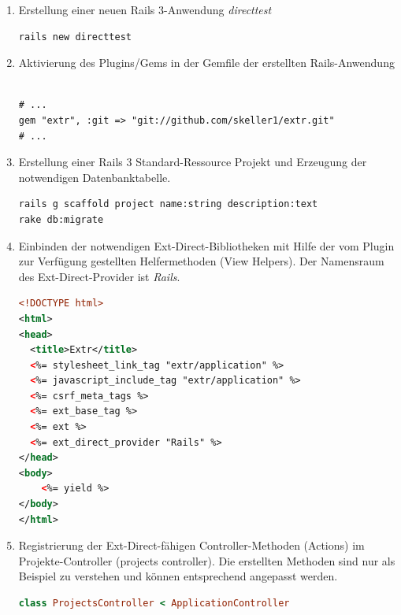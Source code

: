 \begin{enumerate}
\item
Erstellung einer neuen Rails 3-Anwendung \emph{directtest}
\begin{lstlisting}[frame=single, numbers=none]
rails new directtest
\end{lstlisting}
\item
Aktivierung des Plugins/Gems in der Gemfile der erstellten Rails-Anwendung

\begin{lstlisting}[frame=single, numbers=none]

# ...
gem "extr", :git => "git://github.com/skeller1/extr.git"
# ...

\end{lstlisting}

\item
Erstellung einer Rails 3 Standard-Ressource Projekt und Erzeugung der notwendigen Datenbanktabelle.

\begin{lstlisting}[frame=single, numbers=none]
rails g scaffold project name:string description:text
rake db:migrate
\end{lstlisting}

\item
Einbinden der notwendigen Ext-Direct-Bibliotheken mit Hilfe der vom Plugin zur Verfügung gestellten Helfermethoden (View Helpers). Der Namensraum des Ext-Direct-Provider ist \emph{Rails}.

\begin{lstlisting}[language=xml,frame=single,title=\emph{app/views/layouts/application.html.erb}, numbers=none]
<!DOCTYPE html>
<html>
<head>
  <title>Extr</title>
  <%= stylesheet_link_tag "extr/application" %>
  <%= javascript_include_tag "extr/application" %>
  <%= csrf_meta_tags %>
  <%= ext_base_tag %>
  <%= ext %>
  <%= ext_direct_provider "Rails" %>
</head>
<body>
    <%= yield %>
</body>
</html>
\end{lstlisting}

\item
Registrierung der Ext-Direct-fähigen Controller-Methoden (Actions) im Projekte-Controller (projects controller). Die erstellten Methoden sind nur als Beispiel zu verstehen und können entsprechend angepasst werden.

\begin{lstlisting}[language=ruby,frame=single,title=\emph{app/controllers/projects\_controller.rb}, numbers=none]
class ProjectsController < ApplicationController


\end{lstlisting}
\end{enumerate}

